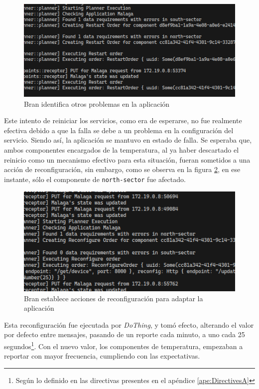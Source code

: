 \begin{figure}[ht]
    \centering
    \caption{Bran identifica otros problemas en la aplicación}
    \label{fig:BranPlan2}
    \includegraphics[width=0.9\linewidth]{images/BranRestarting.png}
    \vspace{-4mm}
\end{figure}

Este intento de reiniciar los servicios, como era de esperarse, no fue realmente efectiva debido a que la falla se debe a un problema en la configuración del servicio. Siendo así, la aplicación se mantuvo en estado de falla. Se esperaba que, ambos componentes encargados de la temperatura, al ya haber descartado el reinicio como un mecanismo efectivo para esta situación, fueran sometidos a una acción de reconfiguración, sin embargo, como se observa en la figura \ref{fig:BranPlan3}, en ese instante, sólo el componente de \texttt{north-sector} fue afectado.

\begin{figure}[ht]
    \centering
    \caption{Bran establece acciones de reconfiguración para adaptar la aplicación}
    \label{fig:BranPlan3}
    \includegraphics[width=0.9\linewidth]{images/BranReconfiguring.png}
    \vspace{-4mm}
\end{figure}

Esta reconfiguración fue ejecutada por \textit{DoThing}, y tomó efecto, alterando el valor por defecto entre mensajes, pasando de un reporte cada minuto, a uno cada 25 segundos\footnote{Según lo definido en las directivas presentes en el apéndice \ref{ape:DirectivesA}}. Con el nuevo valor, los componentes de temperatura, empezaban a reportar con mayor frecuencia, cumpliendo con las expectativas.

